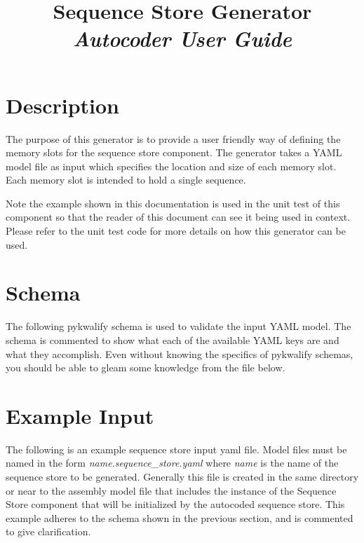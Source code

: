 



\title{\textbf{Sequence Store Generator} \\
\large\textit{Autocoder User Guide}}
\date{}
\maketitle

\section{Description}

The purpose of this generator is to provide a user friendly way of defining the memory slots for the sequence store component. The generator takes a YAML model file as input which specifies the location and size of each memory slot. Each memory slot is intended to hold a single sequence. 

Note the example shown in this documentation is used in the unit test of this component so that the reader of this document can see it being used in context. Please refer to the unit test code for more details on how this generator can be used.

\section{Schema}

The following pykwalify schema is used to validate the input YAML model. The schema is commented to show what each of the available YAML keys are and what they accomplish. Even without knowing the specifics of pykwalify schemas, you should be able to gleam some knowledge from the file below.


\section{Example Input}

The following is an example sequence store input yaml file. Model files must be named in the form \textit{name.sequence\_store.yaml} where \textit{name} is the name of the sequence store to be generated. Generally this file is created in the same directory or near to the assembly model file that includes the instance of the Sequence Store component that will be initialized by the autocoded sequence store. This example adheres to the schema shown in the previous section, and is commented to give clarification.

